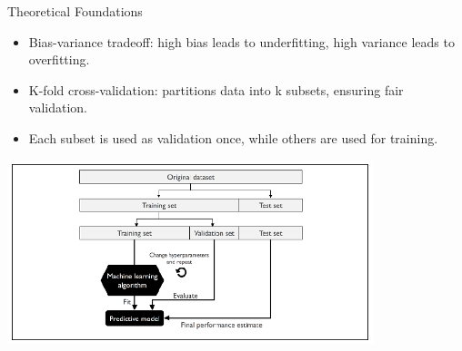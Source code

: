\documentclass[11pt]{beamer}
\begin{document}
\begin{frame}{Theoretical Foundations}
    \begin{itemize}
        \item Bias-variance tradeoff: high bias leads to underfitting, high variance leads to overfitting.
        \item K-fold cross-validation: partitions data into k subsets, ensuring fair validation.
        \item Each subset is used as validation once, while others are used for training.
    \end{itemize}
    \includegraphics[width=0.8\textwidth]{../05-pictures/lesson-4-2_pic_0.png}
\end{frame}
\end{document}
